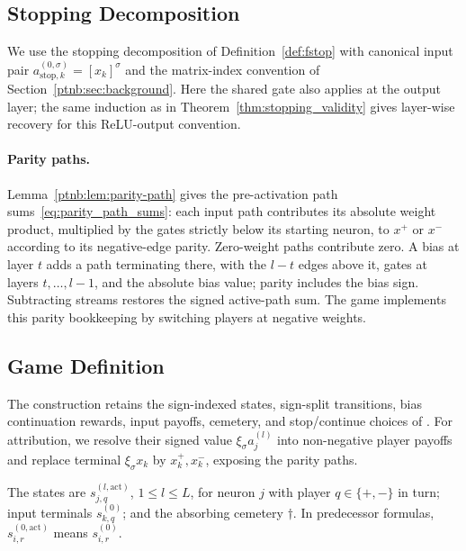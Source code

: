 \subsection{Stopping Decomposition}\label{ptnb:app:dc-decomp}\label{ptnb:app:decompositions}

We use the stopping decomposition of Definition~\ref{def:fstop} with canonical input pair $a_{\mathrm{stop},k}^{(0,\sigma)}=[x_k]^\sigma$ and the matrix-index convention of Section~\ref{ptnb:sec:background}. Here the shared gate also applies at the output layer; the same induction as in Theorem~\ref{thm:stopping_validity} gives layer-wise recovery for this ReLU-output convention.

\paragraph{Parity paths.}\label{ptnb:app:parity-path}
Lemma~\ref{ptnb:lem:parity-path} gives the pre-activation path sums~\eqref{eq:parity_path_sums}: each input path
contributes its absolute weight product, multiplied by the gates strictly below its starting
neuron, to $x^+$ or $x^-$ according to its negative-edge parity. Zero-weight paths contribute zero.
A bias at layer $t$ adds a path terminating there, with the $l-t$ edges above it, gates at
layers $t,\dots,l-1$, and the absolute bias value; parity includes the bias sign. Subtracting streams restores the signed active-path
sum. The game implements this parity bookkeeping by switching players at negative weights.

\subsection{Game Definition}\label{ptnb:app:adf-game-def}\label{sec:shapley_bellman_recursion}\label{ptnb:app:adf-recursion}

The construction retains the sign-indexed states, sign-split transitions, bias continuation rewards,
input payoffs, cemetery, and stop/continue choices of \textcite{Gaubert2025}. For attribution, we
resolve their signed value $\xi_\sigma a_j^{(l)}$ into non-negative player payoffs and replace terminal
$\xi_\sigma x_k$ by $x_k^+,x_k^-$, exposing the parity paths.

\begin{definition}\label{ptnb:def:adf-game-states}
The states are $s_{j,q}^{(l,\mathrm{act})}$, $1\leq l\leq L$, for neuron $j$ with player
$q\in\{+,-\}$ in turn; input terminals $s_{k,q}^{(0)}$; and the absorbing cemetery $\dagger$.
In predecessor formulas, $s_{i,r}^{(0,\mathrm{act})}$ means $s_{i,r}^{(0)}$.
\end{definition}


